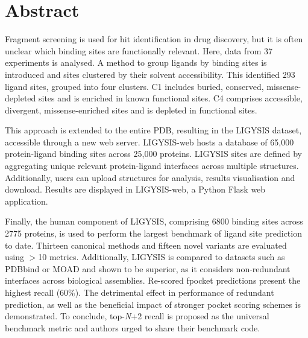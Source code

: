 \chapter*{Abstract} %

Fragment screening is used for hit identification in drug discovery, but it is often unclear which binding sites are functionally relevant. Here, data from 37 experiments is analysed. A method to group ligands by binding sites is introduced and sites clustered by their solvent accessibility. This identified 293 ligand sites, grouped into four clusters. C1 includes buried, conserved, missense-depleted sites and is enriched in known functional sites. C4 comprises accessible, divergent, missense-enriched sites and is depleted in functional sites.

This approach is extended to the entire PDB, resulting in the LIGYSIS dataset, accessible through a new web server. LIGYSIS-web hosts a database of 65,000 protein-ligand binding sites across 25,000 proteins. LIGYSIS sites are defined by aggregating unique relevant protein-ligand interfaces across multiple structures. Additionally, users can upload structures for analysis, results visualisation and download. Results are displayed in LIGYSIS-web, a Python Flask web application.

Finally, the human component of LIGYSIS, comprising 6800 binding sites across 2775 proteins, is used to perform the largest benchmark of ligand site prediction to date. Thirteen canonical methods and fifteen novel variants are evaluated using $>$10 metrics. Additionally, LIGYSIS is compared to datasets such as PDBbind or MOAD and shown to be superior, as it considers non-redundant interfaces across biological assemblies. Re-scored fpocket predictions present the highest recall (60\%). The detrimental effect in performance of redundant prediction, as well as the beneficial impact of stronger pocket scoring schemes is demonstrated. To conclude, top-\textit{N}+2 recall is proposed as the universal benchmark metric and authors urged to share their benchmark code.
